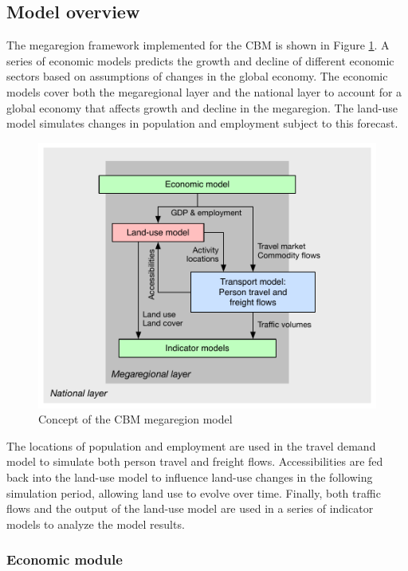 \subsection{Model overview}\label{sec:cbm-model-overview}

The megaregion framework implemented for the CBM is shown in Figure \ref{fig:integrated-megaregion-model-concept}. A series of economic models predicts the growth and decline of different economic sectors based on assumptions of changes in the global economy. The economic models cover both the megaregional layer and the national layer to account for a global economy that affects growth and decline in the megaregion. The land-use model simulates changes in population and employment subject to this forecast.

\begin{figure}   %
\centering
\includegraphics[scale=0.6]{graphics/49-integrated-megaregion-model-concept}
\caption{Concept of the CBM megaregion model}
\label{fig:integrated-megaregion-model-concept}
\end{figure}

The locations of population and employment are used in the travel demand model to simulate both person travel and freight flows. Accessibilities are fed back into the land-use model to influence land-use changes in the following simulation period, allowing land use to evolve over time. Finally, both traffic flows and the output of the land-use model are used in a series of indicator models to analyze the model results.

\subsubsection{Economic module}

